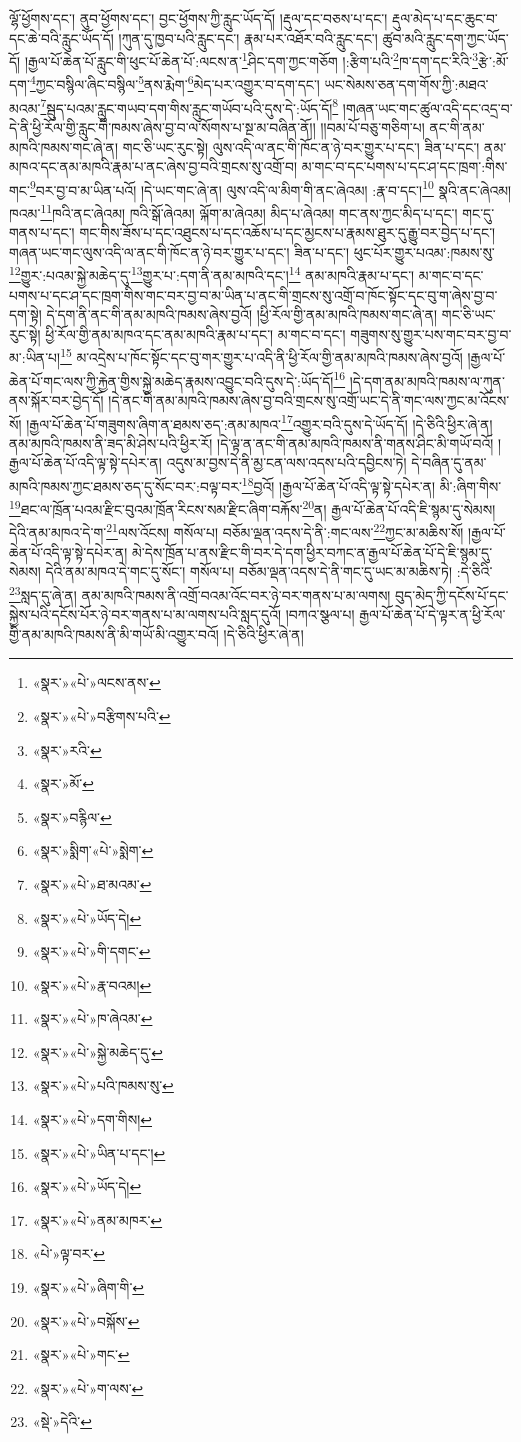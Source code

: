 ལྷོ་ཕྱོགས་དང་། ནུབ་ཕྱོགས་དང་། བྱང་ཕྱོགས་ཀྱི་རླུང་ཡོད་དོ། །རྡུལ་དང་བཅས་པ་དང་། རྡུལ་མེད་པ་དང་ཆུང་བ་དང་ཆེ་བའི་རླུང་ཡོད་དོ། །ཀུན་དུ་ཁྱབ་པའི་རླུང་དང་། རྣམ་པར་འཐོར་བའི་རླུང་དང་། ཚུབ་མའི་རླུང་དག་ཀྱང་ཡོད་དོ། །རྒྱལ་པོ་ཆེན་པོ་རླུང་གི་ཕུང་པོ་ཆེན་པོ་:ལངས་ན་\footnote{«སྣར་»«པེ་»ལངས་ནས་}ཤིང་དག་ཀྱང་གཅོག །:རྩིག་པའི་\footnote{«སྣར་»«པེ་»བརྩིགས་པའི་}ཁ་དག་དང་རིའི་\footnote{«སྣར་»རའི་}རྩེ་:མོ་དག་\footnote{«སྣར་»མོ་}ཀྱང་བསྙིལ་ཞིང་བསྙིལ་\footnote{«སྣར་»བརྙིལ་}ནས་རྨེག་\footnote{«སྣར་»སྨིག་«པེ་»སྨེག་}མེད་པར་འགྱུར་བ་དག་དང་། ཡང་སེམས་ཅན་དག་གོས་ཀྱི་:མཐའ་མའམ་\footnote{«སྣར་»«པེ་»ཐ་མའམ་}སྦུད་པའམ་རླུང་གཡབ་དག་གིས་རླུང་གཡོབ་པའི་དུས་དེ་:ཡོད་དོ།\footnote{«སྣར་»«པེ་»ཡོད་དེ།} །གཞན་ཡང་གང་ཚུལ་འདི་དང་འདྲ་བ་དེ་ནི་ཕྱི་རོལ་གྱི་རླུང་གི་ཁམས་ཞེས་བྱ་བ་ལ་སོགས་པ་སྔ་མ་བཞིན་ནོ།། །།བམ་པོ་བཅུ་གཅིག་པ། ནང་གི་ནམ་མཁའི་ཁམས་གང་ཞེ་ན། གང་ཅི་ཡང་རུང་སྟེ། ལུས་འདི་ལ་ནང་གི་ཁོང་ན་ཉེ་བར་གྱུར་པ་དང་། ཟིན་པ་དང་། ནམ་མཁའ་དང་ནམ་མཁའི་རྣམ་པ་ནང་ཞེས་བྱ་བའི་གྲངས་སུ་འགྲོ་བ། མ་གང་བ་དང་པགས་པ་དང་ཤ་དང་ཁྲག་:གིས་གང་\footnote{«སྣར་»«པེ་»གི་དགང་}བར་བྱ་བ་མ་ཡིན་པའོ། །དེ་ཡང་གང་ཞེ་ན། ལུས་འདི་ལ་མིག་གི་ནང་ཞེའམ། :རྣ་བ་དང་།\footnote{«སྣར་»«པེ་»རྣ་བའམ།} སྣའི་ནང་ཞེའམ། ཁའམ་\footnote{«སྣར་»«པེ་»ཁ་ཞེའམ་}ཁའི་ནང་ཞེའམ། ཁའི་སྒོ་ཞེའམ། ལྐོག་མ་ཞེའམ། མིད་པ་ཞེའམ། གང་ནས་ཀྱང་མིད་པ་དང་། གང་དུ་གནས་པ་དང་། གང་གིས་ཟོས་པ་དང་འཐུངས་པ་དང་འཆོས་པ་དང་མྱངས་པ་རྣམས་ཐུར་དུ་རྒྱུ་བར་བྱེད་པ་དང་། གཞན་ཡང་གང་ལུས་འདི་ལ་ནང་གི་ཁོང་ན་ཉེ་བར་གྱུར་པ་དང་། ཟིན་པ་དང་། ཕུང་པོར་གྱུར་པའམ་:ཁམས་སུ་\footnote{«སྣར་»«པེ་»སྐྱེ་མཆེད་དུ་}གྱུར་:པའམ་སྐྱེ་མཆེད་དུ་\footnote{«སྣར་»«པེ་»པའི་ཁམས་སུ་}གྱུར་པ་:དག་ནི་ནམ་མཁའི་དང་།\footnote{«སྣར་»«པེ་»དག་གིས།} ནམ་མཁའི་རྣམ་པ་དང་། མ་གང་བ་དང་པགས་པ་དང་ཤ་དང་ཁྲག་གིས་གང་བར་བྱ་བ་མ་ཡིན་པ་ནང་གི་གྲངས་སུ་འགྲོ་བ་ཁོང་སྟོང་དང་བུ་ག་ཞེས་བྱ་བ་དག་སྟེ། དེ་དག་ནི་ནང་གི་ནམ་མཁའི་ཁམས་ཞེས་བྱའོ། །ཕྱི་རོལ་གྱི་ནམ་མཁའི་ཁམས་གང་ཞེ་ན། གང་ཅི་ཡང་རུང་སྟེ། ཕྱི་རོལ་གྱི་ནམ་མཁའ་དང་ནམ་མཁའི་རྣམ་པ་དང་། མ་གང་བ་དང་། གཟུགས་སུ་གྱུར་པས་གང་བར་བྱ་བ་མ་:ཡིན་པ།\footnote{«སྣར་»«པེ་»ཡིན་པ་དང་།} མ་འདྲེས་པ་ཁོང་སྟོང་དང་བུ་གར་གྱུར་པ་འདི་ནི་ཕྱི་རོལ་གྱི་ནམ་མཁའི་ཁམས་ཞེས་བྱའོ། །རྒྱལ་པོ་ཆེན་པོ་གང་ལས་ཀྱི་རྐྱེན་གྱིས་སྐྱེ་མཆེད་རྣམས་འབྱུང་བའི་དུས་དེ་:ཡོད་དོ།\footnote{«སྣར་»«པེ་»ཡོད་དེ།} །དེ་དག་ནམ་མཁའི་ཁམས་ལ་ཀུན་ནས་སྐོར་བར་བྱེད་དོ། །དེ་ནང་གི་ནམ་མཁའི་ཁམས་ཞེས་བྱ་བའི་གྲངས་སུ་འགྲོ་ཡང་དེ་ནི་གང་ལས་ཀྱང་མ་འོངས་སོ། །རྒྱལ་པོ་ཆེན་པོ་གཟུགས་ཞིག་ན་ཐམས་ཅད་:ནམ་མཁའ་\footnote{«སྣར་»«པེ་»ནམ་མཁར་}འགྱུར་བའི་དུས་དེ་ཡོད་དོ། །དེ་ཅིའི་ཕྱིར་ཞེ་ན། ནམ་མཁའི་ཁམས་ནི་ཟད་མི་ཤེས་པའི་ཕྱིར་རོ། །དེ་ལྟ་ན་ནང་གི་ནམ་མཁའི་ཁམས་ནི་གནས་ཤིང་མི་གཡོ་བའོ། །རྒྱལ་པོ་ཆེན་པོ་འདི་ལྟ་སྟེ་དཔེར་ན། འདུས་མ་བྱས་དེ་ནི་མྱ་ངན་ལས་འདས་པའི་དབྱིངས་ཏེ། དེ་བཞིན་དུ་ནམ་མཁའི་ཁམས་ཀྱང་ཐམས་ཅད་དུ་སོང་བར་:བལྟ་བར་\footnote{«པེ་»ལྟ་བར་}བྱའོ། །རྒྱལ་པོ་ཆེན་པོ་འདི་ལྟ་སྟེ་དཔེར་ན། མི་:ཞིག་གིས་\footnote{«སྣར་»«པེ་»ཞིག་གི་}ཐང་ལ་ཁྲོན་པའམ་རྫིང་བུའམ་ཁྲོན་རིངས་སམ་རྫིང་ཞིག་བརྐོས་\footnote{«སྣར་»«པེ་»བསྐོས་}ན། རྒྱལ་པོ་ཆེན་པོ་འདི་ཇི་སྙམ་དུ་སེམས། དེའི་ནམ་མཁའ་དེ་ག་\footnote{«སྣར་»«པེ་»གང་}ལས་འོངས། གསོལ་པ། བཅོམ་ལྡན་འདས་དེ་ནི་:གང་ལས་\footnote{«སྣར་»«པེ་»ག་ལས་}ཀྱང་མ་མཆིས་སོ། །རྒྱལ་པོ་ཆེན་པོ་འདི་ལྟ་སྟེ་དཔེར་ན། མེ་དེས་ཁྲོན་པ་ནས་རྫིང་གི་བར་དེ་དག་ཕྱིར་བཀང་ན་རྒྱལ་པོ་ཆེན་པོ་དེ་ཇི་སྙམ་དུ་སེམས། དེའི་ནམ་མཁའ་དེ་གང་དུ་སོང་། གསོལ་པ། བཅོམ་ལྡན་འདས་དེ་ནི་གང་དུ་ཡང་མ་མཆིས་ཏེ། :དེ་ཅིའི་\footnote{«སྡེ་»དེའི་}སླད་དུ་ཞེ་ན། ནམ་མཁའི་ཁམས་ནི་འགྲོ་བའམ་འོང་བར་ཉེ་བར་གནས་པ་མ་ལགས། བུད་མེད་ཀྱི་དངོས་པོ་དང་སྐྱེས་པའི་དངོས་པོར་ཉེ་བར་གནས་པ་མ་ལགས་པའི་སླད་དུའོ། །བཀའ་སྩལ་པ། རྒྱལ་པོ་ཆེན་པོ་དེ་ལྟར་ན་ཕྱི་རོལ་གྱི་ནམ་མཁའི་ཁམས་ནི་མི་གཡོ་མི་འགྱུར་བའོ། །དེ་ཅིའི་ཕྱིར་ཞེ་ན། 